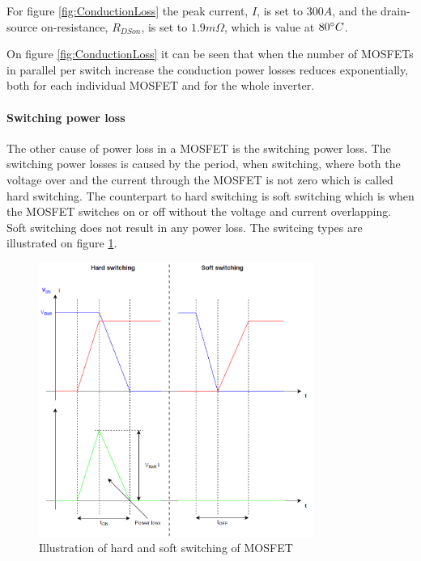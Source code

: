 For figure \ref{fig:ConductionLoss} the peak current, $I$, is set to $300 A$, and the drain-source on-resistance, $R_{DSon}$, is set to ${1.9 m \Omega}$, which is value at $80 \degree C$. 

On figure \ref{fig:ConductionLoss} it can be seen that when the number of MOSFETs in parallel per switch increase the conduction power losses reduces exponentially, both for each individual MOSFET and for the whole inverter.

\paragraph{Switching power loss}
The other cause of power loss in a MOSFET is the switching power loss. The switching power losses is caused by the period, when switching, where both the voltage over and the current through the MOSFET is not zero which is called hard switching. The counterpart to hard switching is soft switching which is when the MOSFET switches on or off without the voltage and current overlapping. Soft switching does not result in any power loss. The switcing types are illustrated on figure \ref{fig:HardSoftSwitch}.

    \begin{figure}[H]
		\centering
		\includegraphics[width=0.8\textwidth]{pictures/hardware/Power_Board/Hard_soft_switching.PNG}
		\caption{Illustration of hard and soft switching of MOSFET}
		\label{fig:HardSoftSwitch}
	\end{figure} 

